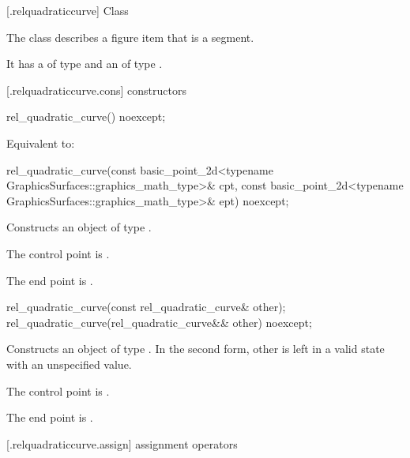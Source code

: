  [\iotwod.relquadraticcurve] {Class }

\pnum
{}%
The class  describes a figure item that is a segment.

\pnum
It has a  of type  and an  of type .

 [\iotwod.relquadraticcurve.cons] { constructors}

%
\begin{itemdecl}
rel_quadratic_curve() noexcept;
\end{itemdecl}
\begin{itemdescr}
\pnum
\effects
Equivalent to: 
\end{itemdescr}

%
\begin{itemdecl}
rel_quadratic_curve(const basic_point_2d<typename GraphicsSurfaces::graphics_math_type>& cpt,
  const basic_point_2d<typename GraphicsSurfaces::graphics_math_type>& ept) noexcept;
\end{itemdecl}
\begin{itemdescr}
\pnum
\effects
Constructs an object of type .

\pnum
The control point is .

\pnum
The end point is .
\end{itemdescr}

%
\begin{itemdecl}
rel_quadratic_curve(const rel_quadratic_curve& other);
rel_quadratic_curve(rel_quadratic_curve&& other) noexcept;
\end{itemdecl}
\begin{itemdescr}
\pnum
\effects
Constructs an object of type . In the second form, other is left in a valid state with an unspecified value.

\pnum
The control point is .

\pnum
The end point is .
\end{itemdescr}

 [\iotwod.relquadraticcurve.assign] { assignment operators}

